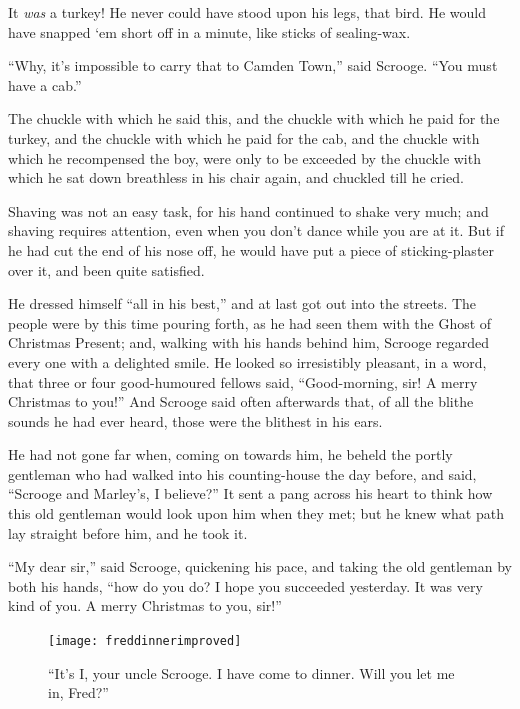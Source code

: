 \documentclass[paper=5.5in:8.5in,BCOR=7mm,twoside,DIV=calc,12pt,usegeometry]{scrbook} %
\begin{document}
It \textit{was} a turkey! He never could have stood upon his legs, that bird. He would have snapped `em short off in a minute, like sticks of sealing-wax.

\enquote{Why, it's impossible to carry that to Camden Town,} said Scrooge. \enquote{You must have a cab.}

The chuckle with which he said this, and the chuckle with which he paid for the turkey, and the chuckle with which he paid for the cab, and the chuckle with which he recompensed the boy, were only to be exceeded by the chuckle with which he sat down breathless in his chair again, and chuckled till he cried.

Shaving was not an easy task, for his hand continued to shake very much; and shaving requires attention, even when you don't dance while you are at it. But if he had cut the end of his nose off, he would have put a piece of sticking-plaster over it, and been quite satisfied.

He dressed himself \enquote{all in his best,} and at last got out into the streets. The people were by this time pouring forth, as he had seen them with the Ghost of Christmas Present; and, walking with his hands behind him, Scrooge regarded every one with a delighted smile. He looked so irresistibly pleasant, in a word, that three or four good-humoured fellows said, \enquote{Good-morning, sir! A merry Christmas to you!} And Scrooge said often afterwards that, of all the blithe sounds he had ever heard, those were the blithest in his ears.

He had not gone far when, coming on towards him, he beheld the portly gentleman who had walked into his counting-house the day before, and said, \enquote{Scrooge and Marley's, I believe?} It sent a pang across his heart to think how this old gentleman would look upon him when they met; but he knew what path lay straight before him, and he took it.

\enquote{My dear sir,} said Scrooge, quickening his pace, and taking the old gentleman by both his hands, \enquote{how do you do? I hope you succeeded yesterday. It was very kind of you. A merry Christmas to you, sir!}

\begin{figure}[p]
\begin{minipage}[c]{\linewidth}
\texttt{[image: freddinnerimproved]}
\caption[\enquote{Will you let me in, Fred?}]{\enquote{It's I, your uncle Scrooge. I have come to dinner. Will you let me in, Fred?}}
\end{minipage}
\end{figure}
\end{document}
